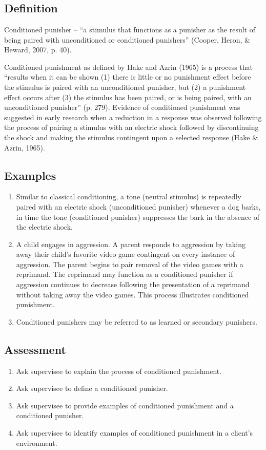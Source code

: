 \section{\fourFKTwenty{}}
\subsection{Definition}
Conditioned punisher – ``a stimulus that functions as a punisher as the result of being paired with unconditioned or conditioned punishers'' (Cooper, Heron, \& Heward, 2007, p. 40).

Conditioned punishment as defined by Hake and Azrin (1965) is a process that ``results when it can be shown (1) there is little or no punishment effect before the stimulus is paired with an unconditioned punisher, but (2) a punishment effect occurs after (3) the stimulus has been paired, or is being paired, with an unconditioned punisher'' (p. 279).  Evidence of conditioned punishment was suggested in early research when a reduction in a response was observed following the process of pairing a stimulus with an electric shock followed by discontinuing the shock and making the stimulus contingent upon a selected response (Hake \& Azrin, 1965).

\subsection{Examples}
\begin{enumerate}
\item Similar to classical conditioning, a tone (neutral stimulus) is repeatedly paired with an electric shock (unconditioned punisher) whenever a dog barks, in time the tone (conditioned punisher) suppresses the bark in the absence of the electric shock.
\item A child engages in aggression. A parent responds to aggression by taking away their child's favorite video game contingent on every instance of aggression.  The parent begins to pair removal of the video games with a reprimand.  The reprimand may function as a conditioned punisher if aggression continues to decrease following the presentation of a reprimand without taking away the video games.  This process illustrates conditioned punishment. 
\item Conditioned punishers may be referred to as learned or secondary punishers.
%
\end{enumerate}
%
\subsection{Assessment}
\begin{enumerate}
\item Ask supervisee to explain the process of conditioned punishment.
\item Ask supervisee to define a conditioned punisher.
\item Ask supervisee to provide examples of conditioned punishment and a conditioned punisher.
\item Ask supervisee to identify examples of conditioned punishment in a client's environment.
%
\end{enumerate}
%
